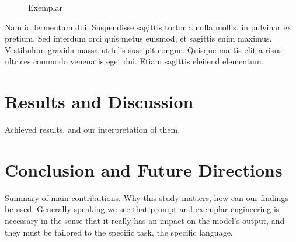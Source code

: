 \documentclass[sigconf]{acmart}
\begin{document}
\begin{figure}[h]
\centering
{}
\caption{Exemplar}
\end{figure}

Nam id fermentum dui. Suspendisse sagittis tortor a nulla mollis, in
pulvinar ex pretium. Sed interdum orci quis metus euismod, et sagittis
enim maximus. Vestibulum gravida massa ut felis suscipit
congue. Quisque mattis elit a risus ultrices commodo venenatis eget
dui. Etiam sagittis eleifend elementum.

\section{Results and Discussion}
Achieved results, and our interpretation of them.

\section{Conclusion and Future Directions}
Summary of main contributions. Why this study matters, how can our findings be used. Generally speaking we see that prompt and exemplar engineering is necessary in the sense that it really has an impact on the model's output, and they must be tailored to the specific task, the specific language.
\end{document}
